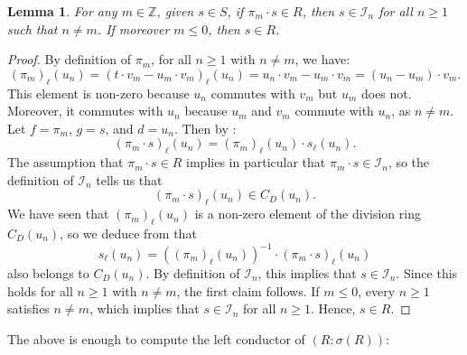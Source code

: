 \documentclass{amsart}
\newtheorem{lem}[equation]{Lemma}
\theoremstyle{definition}
\numberwithin{equation}{section}
\begin{document}
\begin{lem}\label{lem:canc}
For any $m \in \mathbb{Z}$,
given $s \in S$,
if $\pi_m\cdot s \in R$, then $s \in \mathcal{I}_n$ for all $n \ge 1$ such that $n \ne m$.
If moreover $m \le 0$, then $s \in R$.
\end{lem}
\begin{proof}
By definition of $\pi_m$, for all $n \ge 1$ with $n \ne m$, we have:
\[
(\pi_m)_{\ell}(u_n) = (t\cdot v_m-u_m \cdot v_m)_{\ell}(u_n) = 
u_n\cdot v_m-u_m\cdot v_m = (u_n-u_m)\cdot v_m.
\]
This element is non-zero because $u_n$ commutes with $v_m$ but $u_m$ does not.
Moreover, it commutes with $u_n$ because $u_m$ and $v_m$ commute with $u_n$, as $n \ne m$.
Let $f = \pi_m$, $g=s$, and $d = u_n$.
Then by :
\begin{equation}\label{eqn:multell}
(\pi_m\cdot s)_{\ell}(u_n) = (\pi_m)_{\ell}(u_n) \cdot s_{\ell}(u_n).
\end{equation}
The assumption that $\pi_m\cdot s \in R$ implies in particular that $\pi_m\cdot s \in \mathcal{I}_n$,
so the definition of $\mathcal{I}_n$ tells us that
\[
(\pi_m\cdot s)_{\ell}(u_n) \in C_D(u_n).
\]
We have seen that $(\pi_m)_{\ell}(u_n)$ is a non-zero element of the division ring $C_D(u_n)$,
so we deduce from  that
\[
s_{\ell}(u_n) = \left((\pi_m)_{\ell}(u_n)\right)^{-1} \cdot (\pi_m\cdot s)_{\ell}(u_n)
\]
also belongs to $C_D(u_n)$.
By definition of $\mathcal{I}_n$,
this implies that $s \in \mathcal{I}_n$.
Since this holds for all $n \ge 1$ with $n \ne m$, the first claim follows. If $m \le 0$, every $n \ge 1$ satisfies $n \ne m$,
which implies that $s \in \mathcal{I}_n$ for all $n \ge 1$.
Hence, $s \in R$.
\end{proof}

The above is enough to compute the left conductor of $(R:\sigma(R))$:
\end{document}
